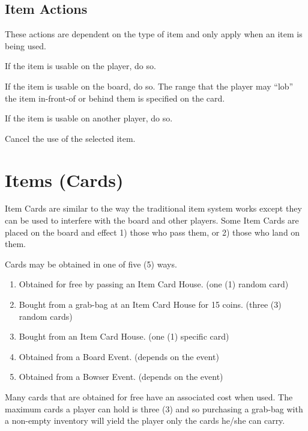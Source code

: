 \documentclass{article}
\begin{document}
\subsection{Item Actions}

These actions are dependent on the type of item and only apply when an item is being used.

\begin{description}[style=nextline]
\item[Use on Self] If the item is usable on the player, do so.
\item[Use on Board] If the item is usable on the board, do so.
The range that the player may ``lob'' the item in-front-of or behind
them is specified on the card.
\item[Use on Player] If the item is usable on another player, do so.
\item[Cancel] Cancel the use of the selected item.
\end{description}


\section{Items (Cards)}

Item Cards are similar to the way the traditional item system works except
they can be used to interfere with the board and other players.
Some Item Cards are placed on the board and effect 1) those who pass them, or 2)
those who land on them.


\noindent
Cards may be obtained in one of five (5) ways.

\begin{enumerate}
\item Obtained for free by passing an Item Card House.
(one (1) random card)
\item Bought from a grab-bag at an Item Card House for 15 coins.
(three (3) random cards)
\item Bought from an Item Card House.
(one (1) specific card)
\item Obtained from a Board Event.
(depends on the event)
\item Obtained from a Bowser Event.
(depends on the event)
\end{enumerate}

Many cards that are obtained for free have an associated cost when used.
The maximum cards a player can hold is three (3) and so purchasing a grab-bag
with a non-empty inventory will yield the player only the cards he/she can
carry.
\vspace{2ex}
\end{document}
